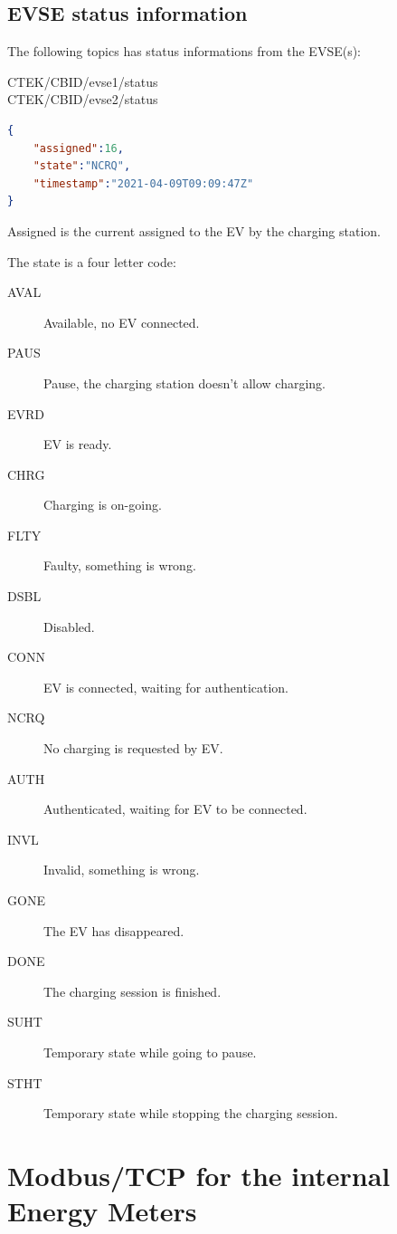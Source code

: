 \documentclass{scrartcl}
\begin{document}
\subsection{EVSE status information}
\label{sec:evse-stat-inform}


The following topics has status informations from the EVSE(s):
\begin{description}
\item[CTEK/CBID/evse1/status]
\item[CTEK/CBID/evse2/status]
\end{description}

\begin{lstlisting}[language=json,caption={EVSE information and status.}]
{
    "assigned":16,
    "state":"NCRQ",
    "timestamp":"2021-04-09T09:09:47Z"
}
\end{lstlisting}

Assigned is the current assigned to the EV by the charging station.

The state is a four letter code:
\begin{description}
\item[AVAL] Available, no EV connected.
\item[PAUS] Pause, the charging station doesn't allow charging.
\item[EVRD] EV is ready.
\item[CHRG] Charging is on-going.
\item[FLTY] Faulty, something is wrong.
\item[DSBL] Disabled.
\item[CONN] EV is connected, waiting for authentication.
\item[NCRQ] No charging is requested by EV.
\item[AUTH] Authenticated, waiting for EV to be connected.
\item[INVL] Invalid, something is wrong.
\item[GONE] The EV has disappeared.
\item[DONE] The charging session is finished.
\item[SUHT] Temporary state while going to pause.
\item[STHT] Temporary state while stopping the charging session.
\end{description}


\section{Modbus/TCP for the internal Energy Meters}
\label{sec:modb-intern-energy}
\end{document}
